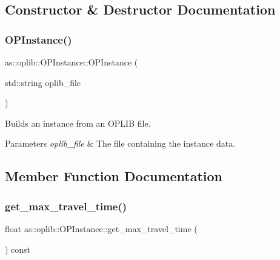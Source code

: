 \subsection{Constructor \& Destructor Documentation}
\mbox{\label{classas_1_1oplib_1_1OPInstance_a6324297e7797771f734a0e373dc6d218}} 
\subsubsection{\texorpdfstring{O\+P\+Instance()}{OPInstance()}}
{\footnotesize\ttfamily as\+::oplib\+::\+O\+P\+Instance\+::\+O\+P\+Instance (\begin{DoxyParamCaption}\item[{std\+::string}]{oplib\+\_\+file }\end{DoxyParamCaption})\hspace{0.3cm}{\ttfamily [inline]}}



Builds an instance from an O\+P\+L\+IB file. 


\begin{DoxyParams}{Parameters}
{\em oplib\+\_\+file} & The file containing the instance data. \\
\hline
\end{DoxyParams}


\subsection{Member Function Documentation}
\mbox{\label{classas_1_1oplib_1_1OPInstance_a8b3d893ac260f673f43d5bc63f24dba1}} 
\subsubsection{\texorpdfstring{get\+\_\+max\+\_\+travel\+\_\+time()}{get\_max\_travel\_time()}}
{\footnotesize\ttfamily float as\+::oplib\+::\+O\+P\+Instance\+::get\+\_\+max\+\_\+travel\+\_\+time (\begin{DoxyParamCaption}{ }\end{DoxyParamCaption}) const\hspace{0.3cm}{\ttfamily [inline]}}



